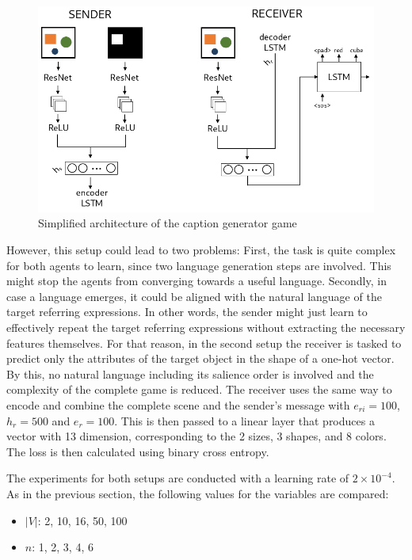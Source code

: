 \begin{figure}[ht]
    \centering
    \includegraphics[width=.7\linewidth]{figures/arch_caption_generator_game.png}
    \caption{Simplified architecture of the caption generator game}
    \label{fig:caption_generator_game_architecture}
\end{figure}

However, this setup could lead to two problems:
First, the task is quite complex for both agents to learn, since two language generation steps are involved.
This might stop the agents from converging towards a useful language.
Secondly, in case a language emerges, it could be aligned with the natural language of the target referring expressions.
In other words, the sender might just learn to effectively repeat the target referring expressions without extracting the necessary features themselves.
For that reason, in the second setup the receiver is tasked to predict only the attributes of the target object in the shape of a one-hot vector.
By this, no natural language including its salience order is involved and the complexity of the complete game is reduced.
The receiver uses the same way to encode and combine the complete scene and the sender's message with $e_{ri}=100$, $h_r=500$ and $e_r=100$.
This is then passed to a linear layer that produces a vector with 13 dimension, corresponding to the 2 sizes, 3 shapes, and 8 colors.
The loss is then calculated using binary cross entropy.


The experiments for both setups are conducted with a learning rate of $2\times10^{-4}$.
As in the previous section, the following values for the variables are compared:
\begin{itemize}
    \item $|V|$: 2, 10, 16, 50, 100
    \item $n$: 1, 2, 3, 4, 6
\end{itemize}

